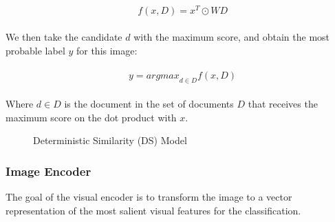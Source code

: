 \documentclass[11pt,a4paper]{article}
\begin{document}
\begin{equation}
\label{equation:attention}
\begin{aligned}
\begin{split}
&f(x,D)=x^T\odot WD
\end{split}

\end{aligned}
\end{equation}

 We then take the candidate $d$ with the maximum score, and obtain the most probable label  $y$ for this image:

\begin{equation}
\label{equation:attention}
\begin{aligned}
\begin{split}
&y={argmax}_{d\in D}f(x,D)
\end{split}

\end{aligned}
\end{equation}

Where $d\in D$ is the document in the set of documents $D$ that receives the maximum score on the dot product with $x$. 



\begin{figure}[t]
\centering
{}
 \caption{Deterministic Similarity (DS) Model}
\label{fig:DS}
\end{figure}

\subsubsection{Image Encoder}
\label{section:Image_Encoder}
The goal of the visual encoder is to transform the image to a vector representation of the most salient visual features for the classification.\par
\end{document}
